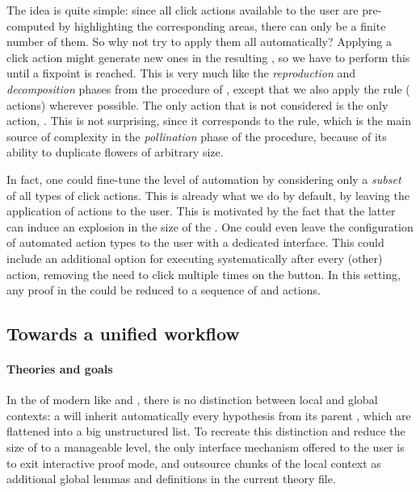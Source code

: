 The idea is quite simple: since all click actions available to the user are
pre-computed by highlighting the corresponding areas, there can only be a finite
number of them. So why not try to apply them all automatically? Applying a click
action might generate new ones in the resulting , so we have to perform this
until a fixpoint is reached. This is very much like the \emph{reproduction} and
\emph{decomposition} phases from the  procedure of
, except that we also apply the  rule
( actions) wherever possible. The only \Proof action that is not
considered is the only  action, . This is not surprising,
since it corresponds to the  rule, which is the main source of
complexity in the \emph{pollination} phase of the  procedure,
because of its ability to duplicate flowers of arbitrary size.

In fact, one could fine-tune the level of automation by considering only a
\emph{subset} of all types of click actions. This is already what we do by
default, by leaving the application of  actions to the user. This
is motivated by the fact that the latter can induce an explosion in the size of
the . One could even leave the configuration of automated action types to
the user with a dedicated interface. This could include an additional option for
executing  systematically after every (other) \Proof action,
removing the need to click multiple times on the  button. In this
setting, any proof in the  could be reduced to a sequence of
 and  actions.


\subsection{Towards a unified workflow}

\paragraph{Theories and goals}

In the  of modern  like  and ,
there is no distinction between local and global contexts: a  will
inherit automatically every hypothesis from its parent , which are
flattened into a big unstructured list. To recreate this distinction and reduce
the size of  to a manageable level, the only interface mechanism offered to
the user is to exit interactive proof mode, and outsource chunks of the local
context as additional global lemmas and definitions in the current theory file.

